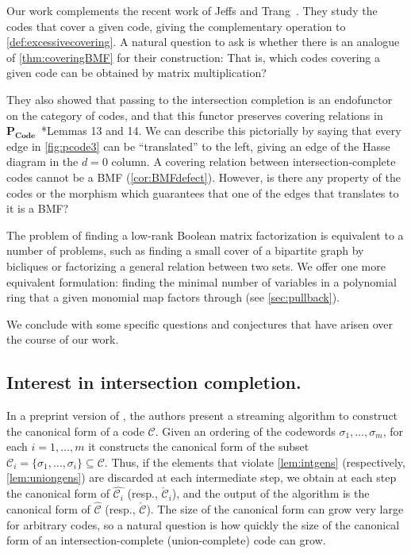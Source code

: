 \documentclass[11pt,letterpaper, reqno]{amsart}
\theoremstyle{definition}
\def\cC{\mathcal{C}}
\def\pcode{\mathbf{P_{Code}}}
\begin{document}
Our work complements the recent work of Jeffs and Trang~\cite{jeffs2025coveringrelationsposetcombinatorial}. They study the codes that cover a given code, giving the complementary operation to \cref{def:excessivecovering}. A natural question to ask is whether there is an analogue of \cref{thm:coveringBMF} for their construction: That is, which codes covering a given code can be obtained by matrix multiplication?

They also showed that passing to the intersection completion is an endofunctor on the category of codes, and that this functor preserves covering relations in $\pcode$~\cite{jeffs2025coveringrelationsposetcombinatorial}*{Lemmas 13 and 14}. 
We can describe this pictorially by saying that every edge in \cref{fig:pcode3} can be ``translated'' to the left, giving an edge of the Hasse diagram in the $d = 0$ column.
A covering relation between intersection-complete codes cannot be a BMF (\cref{cor:BMFdefect}). However, is there any property of the codes or the morphism which guarantees that one of the edges that translates to it is a BMF?

The problem of finding a low-rank Boolean matrix factorization is equivalent to a number of problems, such as finding a small cover of a bipartite graph by bicliques or factorizing a general relation between two sets.
We offer one more equivalent formulation: finding the minimal number of variables in a polynomial ring that a given monomial map factors through (see \cref{sec:pullback}).

We conclude with some specific questions and conjectures that have arisen over the course of our work.

\subsection{Interest in intersection completion.}
    In a preprint version of \cite{curto2019neuralringhomomorphisms}, the authors present a streaming algorithm to construct the canonical form of a code $\cC$. Given an ordering of the codewords $\sigma_1,\dots,\sigma_m$, for each $i = 1,\dots,m$ it constructs the canonical form of the subset $\cC_i = \{\sigma_1,\dots,\sigma_i\} \subseteq\cC$. 
    Thus, if the elements that violate \cref{lem:intgens} (respectively, \cref{lem:uniongens}) are discarded at each intermediate step, we obtain at each step the canonical form of $\widehat{\cC_i}$ (resp., $\check{\cC}_i$), and the output of the algorithm is the canonical form of $\widehat{\cC}$ (resp., $\check{\cC}$).
    The size of the canonical form can grow very large for arbitrary codes, so a natural question is how quickly the size of the canonical form of an intersection-complete (union-complete) code can grow.
\end{document}
